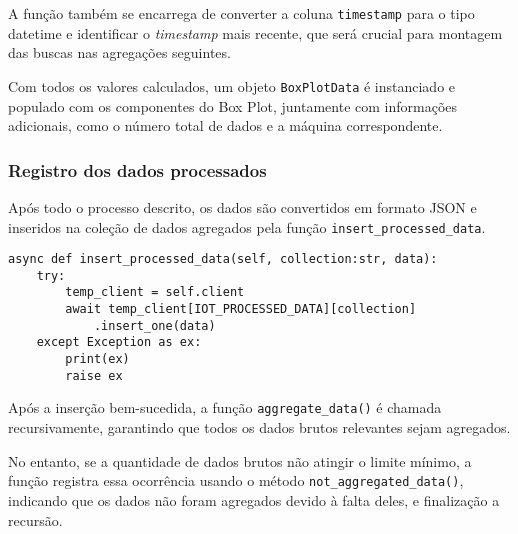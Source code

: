 A função também se encarrega de converter a coluna \texttt{timestamp} para o tipo datetime e identificar o \textit{timestamp} mais recente, que será crucial para montagem das buscas nas agregações seguintes.

Com todos os valores calculados, um objeto \texttt{BoxPlotData} é instanciado e populado com os componentes do Box Plot, juntamente com informações adicionais, como o número total de dados e a máquina correspondente.


\subsubsection{Registro dos dados processados}
Após todo o processo descrito, os dados são convertidos em formato JSON e inseridos na coleção de dados agregados pela função \texttt{insert\_processed\_data}.

\begin{verbatim}
async def insert_processed_data(self, collection:str, data):
    try:
        temp_client = self.client
        await temp_client[IOT_PROCESSED_DATA][collection]
            .insert_one(data)
    except Exception as ex:
        print(ex)
        raise ex
\end{verbatim}

Após a inserção bem-sucedida, a função \texttt{aggregate\_data()} é chamada recursivamente, garantindo que todos os dados brutos relevantes sejam agregados.

No entanto, se a quantidade de dados brutos não atingir o limite mínimo, a função registra essa ocorrência usando o método \texttt{not\_aggregated\_data()}, indicando que os dados não foram agregados devido à falta deles, e finalização a recursão.
